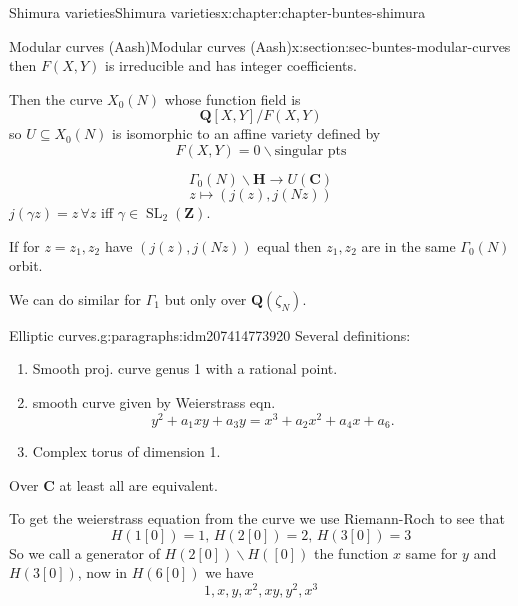 \documentclass[oneside,10pt,]{book}
\numberwithin{equation}{section}
\newcommand{\lb}{[}
\newcommand{\rb}{]}
\newcommand{\ZZ}{\mathbf{Z}}
\newcommand{\QQ}{\mathbf{Q}}
\newcommand{\CC}{\mathbf{C}}
\newcommand{\HH}{\mathbf{H}}
\DeclareMathOperator{\SL}{SL}
\begin{document}
\begin{chapterptx}{Shimura varieties}{}{Shimura varieties}{}{}{x:chapter:chapter-buntes-shimura}
\begin{sectionptx}{Modular curves (Aash)}{}{Modular curves (Aash)}{}{}{x:section:sec-buntes-modular-curves}
\begin{equation*}
\end{equation*}
then \(F(X,Y)\) is irreducible and  has integer coefficients.%
\par
Then the curve \(X_0(N)\) whose function field is%
\begin{equation*}
\QQ \lb X,Y\rb/ F(X,Y)
\end{equation*}
so \(U \subseteq X_0(N)\) is isomorphic to an affine variety defined by%
\begin{equation*}
F(X,Y) = 0 \smallsetminus \text{singular pts}
\end{equation*}
%
\par
%
\begin{equation*}
\Gamma_0(N) \backslash \HH \to U(\CC)
\end{equation*}
%
\begin{equation*}
z \mapsto (j(z), j(Nz))
\end{equation*}
\(j(\gamma z) = z\,\forall z\) iff \(\gamma \in \SL_2(\ZZ)\).%
\par
If for \(z= z_1,z_2\) have \((j(z),j(Nz))\) equal then \(z_1,z_2\) are in the same \(\Gamma_0(N)\) orbit.%
\par
We can do similar for \(\Gamma_1\) but only over \(\QQ(\zeta_N)\).%
\begin{paragraphs}{Elliptic curves.}{g:paragraphs:idm207414773920}%
Several definitions:%
\begin{enumerate}
\item{}Smooth proj. curve genus 1 with a rational point.%
\item{}smooth curve given by Weierstrass eqn.%
\begin{equation*}
y^2 + a_1xy + a_3 y =  x^3 + a_2x^2 + a_4 x + a_6\text{.}
\end{equation*}
%
\item{}Complex torus of  dimension 1.%
\end{enumerate}
%
\par
Over \(\CC\) at least all are equivalent.%
\par
To get the weierstrass equation from the curve we use Riemann-Roch to see that%
\begin{equation*}
H(1[0]) = 1,\, H(2[0]) = 2,\,H(3[0]) =3
\end{equation*}
So we call a generator of \(H(2\lb 0 \rb) \smallsetminus H(\lb 0 \rb)\) the function \(x\) same for \(y\) and \(H(3\lb 0 \rb)\), now in \(H(6 \lb 0 \rb)\) we have%
\begin{equation*}
1,x,y,x^2 ,xy,y^2,x^3
\end{equation*}

\end{paragraphs}
\end{sectionptx}
\end{chapterptx}
\end{document}
